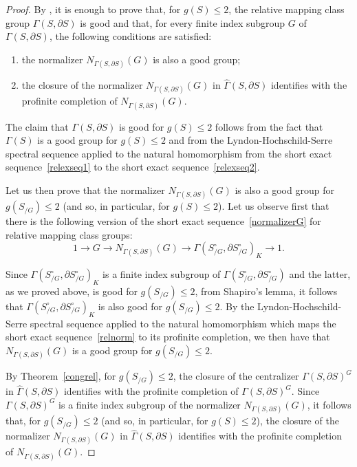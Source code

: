 \documentclass[12pt,twoside]{amsart}
\theoremstyle{definition}
\def\dd{\partial}
\def\G{{\Gamma}}
\def\hG{{\widehat\Gamma}}
\begin{document}
\begin{proof}By \cite[Corollary~C]{BZ}, it is enough to prove that, for $g(S)\leq 2$, the relative mapping class group $\G(S,\dd S)$ 
is good and that, for every finite index subgroup $G$ of $\G(S,\dd S)$, the following conditions are satisfied:
\begin{enumerate}
\item the normalizer $N_{\G(S,\dd S)}(G)$ is also a good group;
\item the closure of the normalizer $N_{\G(S,\dd S)}(G)$ in $\hG(S,\dd S)$ identifies with the profinite completion of $N_{\G(S,\dd S)}(G)$.
\end{enumerate}

The claim that $\G(S,\dd S)$ is good for $g(S)\leq 2$ follows from the fact that $\G(S)$ is a good group for $g(S)\leq 2$ and from the 
Lyndon-Hochschild-Serre spectral sequence applied to the natural homomorphism from the short exact sequence~\eqref{relexseq1} 
to the short exact sequence~\eqref{relexseq2}.

Let us then prove that the normalizer $N_{\G(S,\dd S)}(G)$ is also a good group for $g(S_{/G})\leq 2$ (and so, in particular, for $g(S)\leq 2$).
Let us observe first that there is the following version of the short exact sequence~\eqref{normalizerG} for relative mapping class groups:
\begin{equation}\label{relnorm}
1\to G\to N_{\G(S,\dd S)}(G)\to\G(S_{/G}^\circ,\dd S_{/G}^\circ)_K\to 1.
\end{equation}

Since $\G(S_{/G}^\circ,\dd S_{/G}^\circ)_K$ is a finite index subgroup of $\G(S_{/G}^\circ,\dd S_{/G}^\circ)$ and the latter, as we proved above,
is good for $g(S_{/G})\leq 2$, from Shapiro's lemma, it follows that $\G(S_{/G}^\circ,\dd S_{/G}^\circ)_K$ is also good for $g(S_{/G})\leq 2$.
By the Lyndon-Hochschild-Serre spectral sequence applied to the natural homomorphism which maps the short exact sequence~\eqref{relnorm} 
to its profinite completion, we then have that $N_{\G(S,\dd S)}(G)$ is a good group for $g(S_{/G})\leq 2$. 

By Theorem~\ref{congrel}, for $g(S_{/G})\leq 2$, the closure of the centralizer $\G(S,\dd S)^G$ in $\hG(S,\dd S)$ 
identifies with the profinite completion of $\G(S,\dd S)^G$. Since  $\G(S,\dd S)^G$ is a finite index subgroup of 
the normalizer $N_{\G(S,\dd S)}(G)$, it follows that, for $g(S_{/G})\leq 2$ (and so, in particular, for $g(S)\leq 2$), 
the closure of the normalizer $N_{\G(S,\dd S)}(G)$ in $\hG(S,\dd S)$ identifies with the profinite completion of $N_{\G(S,\dd S)}(G)$.
\end{proof}
 \bigskip
 
\end{document}
